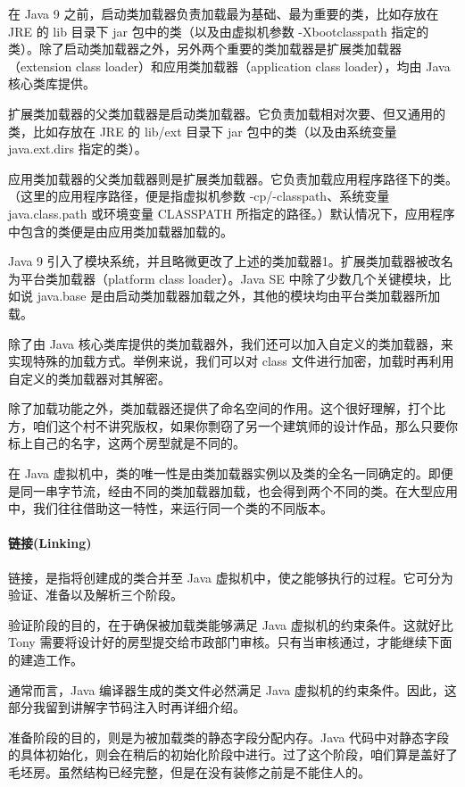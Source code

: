 \documentclass[../../../interview-questions.tex]{subfiles}
\begin{document}
在 Java 9 之前，启动类加载器负责加载最为基础、最为重要的类，比如存放在 JRE 的 lib 目录下 jar 包中的类（以及由虚拟机参数 -Xbootclasspath 指定的类）。除了启动类加载器之外，另外两个重要的类加载器是扩展类加载器（extension class loader）和应用类加载器（application class loader），均由 Java 核心类库提供。

扩展类加载器的父类加载器是启动类加载器。它负责加载相对次要、但又通用的类，比如存放在 JRE 的 lib/ext 目录下 jar 包中的类（以及由系统变量 java.ext.dirs 指定的类）。

应用类加载器的父类加载器则是扩展类加载器。它负责加载应用程序路径下的类。（这里的应用程序路径，便是指虚拟机参数 -cp/-classpath、系统变量 java.class.path 或环境变量 CLASSPATH 所指定的路径。）默认情况下，应用程序中包含的类便是由应用类加载器加载的。

Java 9 引入了模块系统，并且略微更改了上述的类加载器1。扩展类加载器被改名为平台类加载器（platform class loader）。Java SE 中除了少数几个关键模块，比如说 java.base 是由启动类加载器加载之外，其他的模块均由平台类加载器所加载。

除了由 Java 核心类库提供的类加载器外，我们还可以加入自定义的类加载器，来实现特殊的加载方式。举例来说，我们可以对 class 文件进行加密，加载时再利用自定义的类加载器对其解密。

除了加载功能之外，类加载器还提供了命名空间的作用。这个很好理解，打个比方，咱们这个村不讲究版权，如果你剽窃了另一个建筑师的设计作品，那么只要你标上自己的名字，这两个房型就是不同的。

在 Java 虚拟机中，类的唯一性是由类加载器实例以及类的全名一同确定的。即便是同一串字节流，经由不同的类加载器加载，也会得到两个不同的类。在大型应用中，我们往往借助这一特性，来运行同一个类的不同版本。

\paragraph{链接(Linking)}

链接，是指将创建成的类合并至 Java 虚拟机中，使之能够执行的过程。它可分为验证、准备以及解析三个阶段。

验证阶段的目的，在于确保被加载类能够满足 Java 虚拟机的约束条件。这就好比 Tony 需要将设计好的房型提交给市政部门审核。只有当审核通过，才能继续下面的建造工作。

通常而言，Java 编译器生成的类文件必然满足 Java 虚拟机的约束条件。因此，这部分我留到讲解字节码注入时再详细介绍。

准备阶段的目的，则是为被加载类的静态字段分配内存。Java 代码中对静态字段的具体初始化，则会在稍后的初始化阶段中进行。过了这个阶段，咱们算是盖好了毛坯房。虽然结构已经完整，但是在没有装修之前是不能住人的。
\end{document}
